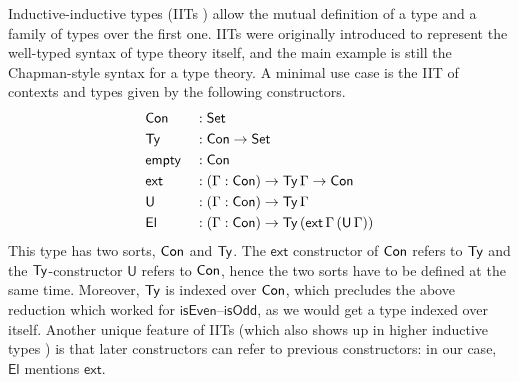 \documentclass[a4paper,UKenglish,cleveref, autoref]{lipics-v2019}
\begin{document}
Inductive-inductive types (IITs \cite{forsberg-phd}) allow the mutual
definition of a type and a family of types over the first one. IITs
were originally introduced to represent the well-typed syntax of type
theory itself, and the main example is still the Chapman-style
\cite{chapman09eatitself} syntax for a type theory. A minimal use case
is the IIT of contexts and types given by the following constructors.
\begin{alignat*}{5}
  & \mathsf{Con} && : \mathsf{Set} \\
  & \mathsf{Ty} && : \mathsf{Con}\rightarrow\mathsf{Set} \\
  & \mathsf{empty} && : \mathsf{Con} \\
  & \mathsf{ext} && : (\Gamma:\mathsf{Con})\rightarrow\mathsf{Ty}\,\Gamma\rightarrow\mathsf{Con} \\
  & \mathsf{U} && : (\Gamma:\mathsf{Con})\rightarrow\mathsf{Ty}\,\Gamma \\
  & \mathsf{El} && : (\Gamma:\mathsf{Con})\rightarrow\mathsf{Ty}\,(\mathsf{ext}\,\Gamma\,(\mathsf{U}\,\Gamma))
\end{alignat*}
This type has two sorts, $\mathsf{Con}$ and $\mathsf{Ty}$. The $\mathsf{ext}$
constructor of $\mathsf{Con}$ refers to $\mathsf{Ty}$ and the $\mathsf{Ty}$-constructor
$\mathsf{U}$ refers to $\mathsf{Con}$, hence the two sorts have to be defined
at the same time. Moreover, $\mathsf{Ty}$ is indexed over $\mathsf{Con}$, which
precludes the above reduction which worked for
$\mathsf{isEven}$--$\mathsf{isOdd}$, as we would get a type indexed
over itself. Another unique feature of IITs (which also shows up in
higher inductive types \cite{HoTTbook}) is that later constructors can
refer to previous constructors: in our case, $\mathsf{El}$ mentions
$\mathsf{ext}$.
\end{document}
